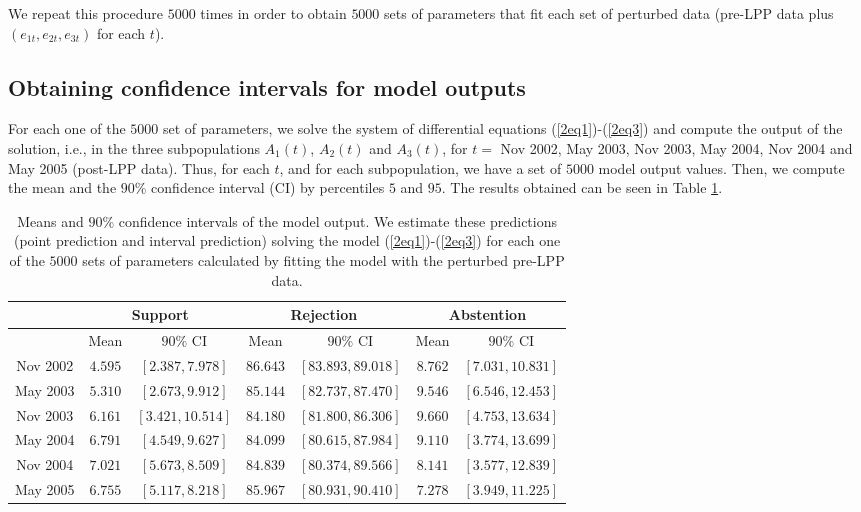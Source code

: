 We repeat this procedure $5000$ times in order to obtain $5000$ sets of parameters that fit each set of perturbed data (pre-LPP data plus $(e_{1t}, e_{2t}, e_{3t})$ for each $t$).

\subsection{Obtaining confidence intervals for model outputs}     
For each one of the $5000$ set of parameters, we solve the system of differential equations (\ref{2eq1})-(\ref{2eq3}) and compute the output of the solution, i.e., in the three subpopulations $A_1(t)$, $A_2(t)$ and $A_3(t)$, for $t=$ Nov 2002, May 2003, Nov 2003, May 2004, Nov 2004 and May 2005 (post-LPP data). Thus, for each $t$, and for each subpopulation, we have a set of $5000$ model output values. Then, we compute the mean and the $90\%$ confidence interval (CI) by percentiles $5$ and $95$. The results obtained can be seen in Table \ref{2TABLACI}.

\begin{table}[ht]
\centering
\begin{scriptsize}
\begin{tabular}{|c|cc|cc|cc|}
\hline
& \multicolumn{2}{|c|}{Support} & \multicolumn{2}{|c|}{Rejection} & \multicolumn{2}{|c|}{Abstention}\\
\hline
 & Mean & $90\%$ CI  & Mean & $90\%$ CI & Mean & $90\%$ CI \\ 
\hline
Nov 2002	& $	4.595	$ & $[	2.387,	7.978	]$ & $	86.643	$ & $[	83.893	,	89.018	]$ & $	8.762	$ & $[	7.031,	10.831	]$ \\
May 2003	& $	5.310	$ & $[	2.673,	9.912	]$ & $	85.144	$ & $[	82.737	,	87.470	]$ & $	9.546	$ & $[	6.546,	12.453	]$ \\
Nov 2003	& $	6.161	$ & $[	3.421,	10.514	]$ & $	84.180	$ & $[	81.800	,	86.306	]$ & $	9.660	$ & $[	4.753,	13.634	]$ \\
May 2004	& $	6.791	$ & $[	4.549,	9.627	]$ & $	84.099	$ & $[	80.615	,	87.984	]$ & $	9.110	$ & $[	3.774,	13.699	]$ \\
Nov 2004	& $	7.021	$ & $[	5.673,	8.509	]$ & $	84.839	$ & $[	80.374	,	89.566	]$ & $	8.141	$ & $[	3.577,	12.839	]$ \\
May 2005	& $	6.755	$ & $[	5.117,	8.218	]$ & $	85.967	$ & $[	80.931	,	90.410	]$ & $	7.278	$ & $[	3.949,	11.225	]$ \\
\hline 
\end{tabular}
\end{scriptsize}
\caption{Means and $90\%$ confidence intervals of the model output. We estimate these predictions (point prediction and interval prediction) solving the model (\ref{2eq1})-(\ref{2eq3}) for each one of the $5000$ sets of parameters calculated by fitting the model with the perturbed pre-LPP data.}
\label{2TABLACI} 
\end{table}

